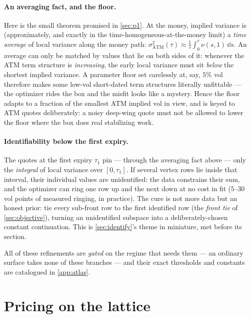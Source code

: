 \documentclass[11pt]{article}
\begin{document}
\paragraph{An averaging fact, and the floor.}  Here is the small theorem
promised in \cref{sec:p1}.  At the money, implied variance is
(approximately, and exactly in the time-homogeneous-at-the-money limit) a
\emph{time average} of local variance along the money path:
$\sigma_{\mathrm{ATM}}^{2}(\tau)\approx\tfrac1\tau\int_0^\tau
\nu(s,1)\,\dd s$.  An average can only be matched by values that lie on
both sides of it: whenever the ATM term structure is \emph{increasing}, the
early local variance must sit \emph{below} the shortest implied variance.
A parameter floor set carelessly at, say, $5\%$ vol therefore makes some
low-vol short-dated term structures literally unfittable --- the optimizer
rides the box and the misfit looks like a mystery.  Hence the floor adapts
to a fraction of the smallest ATM implied vol in view, and is keyed to ATM
quotes deliberately: a noisy deep-wing quote must not be allowed to lower
the floor where the box does real stabilizing work.

\paragraph{Identifiability below the first expiry.}  The quotes at the
first expiry $\tau_1$ pin --- through the averaging fact above --- only the
\emph{integral} of local variance over $[0,\tau_1]$.  If several vertex
rows lie inside that interval, their individual values are unidentified:
the data constrains their sum, and the optimizer can ring one row up and
the next down at no cost in fit ($5$--$30$ vol points of measured ringing,
in practice).  The cure is not more data but an honest prior: tie every
sub-front row to the first identified row (the \emph{front tie} of
\cref{sec:objective}), turning an unidentified subspace into a
deliberately-chosen constant continuation.  This is
\cref{sec:identify}'s theme in miniature, met before its section.

All of these refinements are \emph{gated} on the regime that needs them ---
an ordinary surface takes none of these branches --- and their exact
thresholds and constants are catalogued in \cref{app:atlas}.

\section{Pricing on the lattice}
\label{sec:pricing}
\end{document}
